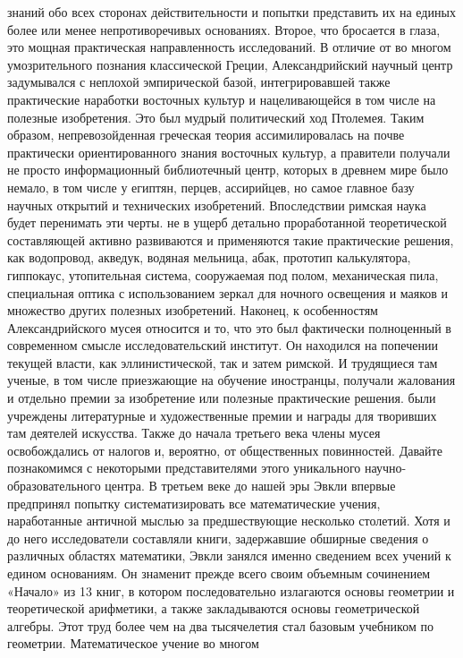 знаний обо всех сторонах действительности и попытки представить их на единых
более или менее непротиворечивых основаниях. Второе, что бросается в глаза, это
мощная практическая направленность исследований. В отличие от во многом
умозрительного познания классической Греции, Александрийский научный центр
задумывался с неплохой эмпирической базой, интегрировавшей также практические
наработки восточных культур и нацеливающейся в том числе на полезные
изобретения. Это был мудрый политический ход Птолемея. Таким образом,
непревозойденная греческая теория ассимилировалась на почве практически
ориентированного знания восточных культур, а правители получали не просто
информационный библиотечный центр, которых в древнем мире было немало, в том
числе у египтян, перцев, ассирийцев, но самое главное базу научных открытий и
технических изобретений. Впоследствии римская наука будет перенимать эти черты.
не в ущерб детально проработанной теоретической составляющей активно развиваются
и применяются такие практические решения, как водопровод, акведук, водяная
мельница, абак, прототип калькулятора, гиппокаус, утопительная система,
сооружаемая под полом, механическая пила, специальная оптика с использованием
зеркал для ночного освещения и маяков и множество других полезных изобретений.
Наконец, к особенностям Александрийского мусея относится и то, что это был
фактически полноценный в современном смысле исследовательский институт. Он
находился на попечении текущей власти, как эллинистической, так и затем римской.
И трудящиеся там ученые, в том числе приезжающие на обучение иностранцы,
получали жалования и отдельно премии за изобретение или полезные практические
решения. были учреждены литературные и художественные премии и награды для
творивших там деятелей искусства. Также до начала третьего века члены мусея
освобождались от налогов и, вероятно, от общественных повинностей. Давайте
познакомимся с некоторыми представителями этого уникального научно-
образовательного центра. В третьем веке до нашей эры Эвкли впервые предпринял
попытку систематизировать все математические учения, наработанные античной
мыслью за предшествующие несколько столетий. Хотя и до него исследователи
составляли книги, задержавшие обширные сведения о различных областях математики,
Эвкли занялся именно сведением всех учений к едином основаниям. Он знаменит
прежде всего своим объемным сочинением «Начало» из 13 книг, в котором
последовательно излагаются основы геометрии и теоретической арифметики, а также
закладываются основы геометрической алгебры. Этот труд более чем на два
тысячелетия стал базовым учебником по геометрии. Математическое учение во многом
